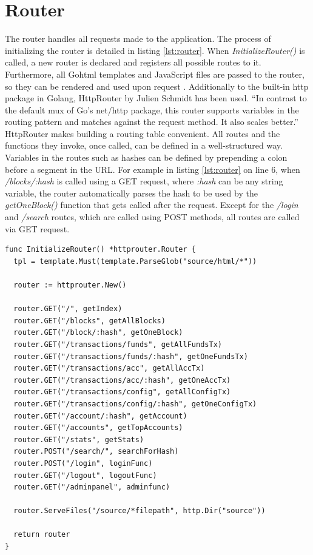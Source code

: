 \section{Router} \label{router}
The router handles all requests made to the application. The process of initializing the router is detailed in listing \ref{lst:router}. When \emph{InitializeRouter()} is called, a new router is declared and registers all possible routes to it. Furthermore, all Gohtml templates and JavaScript files are passed to the router, so they can be rendered and used upon request \cite{httppackage}. 
Additionally to the built-in http package in Golang, HttpRouter by Julien Schmidt \cite{httprouter} has been used. 
``In contrast to the default mux of Go's net/http package, this router supports variables in the routing pattern and matches against the request method. It also scales better.'' \cite{httprouter}
HttpRouter makes building a routing table convenient. All routes and the functions they invoke, once called, can be defined in a well-structured way. Variables in the routes such as hashes can be defined by prepending a colon before a segment in the URL. For example in listing \ref{lst:router} on line 6, when \emph{/blocks/:hash} is called using a GET request, where \emph{:hash} can be any string variable, the router automatically parses the hash to be used by the \emph{getOneBlock()} function that gets called after the request. Except for the \emph{/login} and \emph{/search} routes, which are called using POST methods, all routes are called via GET request.
\\
\begin{lstlisting}[caption={Initialization of the Router},captionpos=b,label={lst:router}]
func InitializeRouter() *httprouter.Router {
  tpl = template.Must(template.ParseGlob("source/html/*"))

  router := httprouter.New()

  router.GET("/", getIndex)
  router.GET("/blocks", getAllBlocks)
  router.GET("/block/:hash", getOneBlock)
  router.GET("/transactions/funds", getAllFundsTx)
  router.GET("/transactions/funds/:hash", getOneFundsTx)
  router.GET("/transactions/acc", getAllAccTx)
  router.GET("/transactions/acc/:hash", getOneAccTx)
  router.GET("/transactions/config", getAllConfigTx)
  router.GET("/transactions/config/:hash", getOneConfigTx)
  router.GET("/account/:hash", getAccount)
  router.GET("/accounts", getTopAccounts)
  router.GET("/stats", getStats)
  router.POST("/search/", searchForHash)
  router.POST("/login", loginFunc)
  router.GET("/logout", logoutFunc)
  router.GET("/adminpanel", adminfunc)

  router.ServeFiles("/source/*filepath", http.Dir("source"))

  return router
}
\end{lstlisting}

